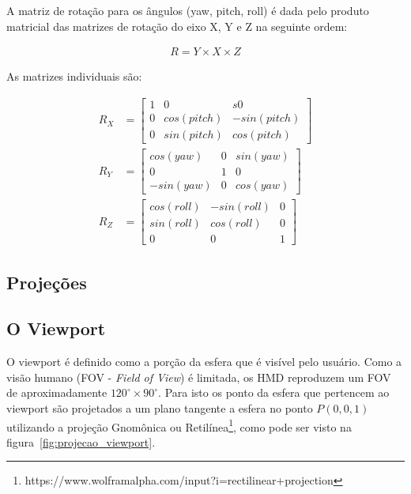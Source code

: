 A matriz de rotação para os ângulos (yaw, pitch, roll) é dada pelo produto matricial das matrizes de rotação do eixo X, Y e Z na seguinte ordem:

\begin{align*}
        R=Y\times X\times Z
\end{align*}

As matrizes individuais são:

\begin{align*}
        R_X &=\begin{bmatrix}
                1 & 0 & s0\\
                0 & cos(pitch) & -sin(pitch)\\
                0 & sin(pitch) & cos(pitch)
        \end{bmatrix}
        \\
        R_Y &=\begin{bmatrix}
                cos(yaw) & 0 & sin(yaw)\\
                0 & 1 & 0\\
                -sin(yaw) & 0 & cos(yaw)
        \end{bmatrix}
        \\
        R_Z &=\begin{bmatrix}
                cos(roll) & -sin(roll) & 0\\
                sin(roll) & cos(roll) & 0\\
                0 & 0 & 1
        \end{bmatrix}
\end{align*}


\subsection{Projeções}


\subsection{O Viewport}

O viewport é definido como a porção da esfera que é visível pelo usuário. Como a visão humano (FOV -\textit{ Field of View}) é limitada, os HMD reproduzem um FOV de aproximadamente $120^\circ\times90^\circ$. Para isto os ponto da esfera que pertencem ao viewport são projetados a um plano tangente a esfera no ponto $ P(0, 0, 1) $ utilizando a projeção Gnomônica ou Retilínea\footnote{https://www.wolframalpha.com/input?i=rectilinear+projection}, como pode ser visto na figura~\ref{fig:projecao_viewport}. 

